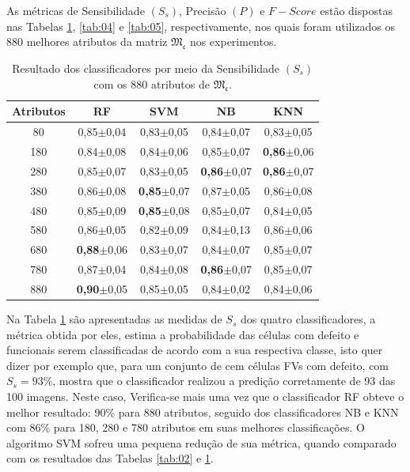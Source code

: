 \documentclass[a4paper]{ifacconf}
\begin{document}
As métricas de  Sensibilidade $(S_s)$, Precisão $(P)$ e $F-Score$ estão dispostas nas Tabelas \ref{tab:03}, \ref{tab:04} e \ref{tab:05}, respectivamente, nos quais foram utilizados os 880 melhores atributos da matriz $\mathfrak{M_c}$ nos experimentos.

\begin{table}[h]	
	\centering
	\caption{Resultado dos classificadores por meio da Sensibilidade $(S_s)$ com os 880 atributos de $\mathfrak{M_c}$.}\label{tab:03}	
		\begin{tabular}{ccccc}\hline
			    \textbf{Atributos} & \textbf{RF} & \textbf{SVM} & \textbf{NB} & \textbf{KNN}\\ \hline
			 80 & 0,85$\pm$0,04 & 0,83$\pm$0,05 & 0,84$\pm$0,07 & 0,83$\pm$0,05 \\
			180 & 0,84$\pm$0,08 & 0,84$\pm$0,06 & 0,85$\pm$0,07 & \textbf{0,86}$\pm$0,06 \\
			280 & 0,85$\pm$0,07 & 0,83$\pm$0,05 & \textbf{0,86}$\pm$0,07 & \textbf{0,86}$\pm$0,07 \\
			380 & 0,86$\pm$0,08 & \textbf{0,85}$\pm$0,07 & 0,87$\pm$0,05 & 0,86$\pm$0,08 \\
			480 & 0,85$\pm$0,09 & \textbf{0,85}$\pm$0,08 & 0,85$\pm$0,07 & 0,84$\pm$0,05 \\
			580 & 0,86$\pm$0,05 & 0,82$\pm$0,09 & 0,84$\pm$0,13 & 0,86$\pm$0,06 \\
			680 & \textbf{0,88}$\pm$0,06 & 0,83$\pm$0,07 & 0,84$\pm$0,07 & 0,85$\pm$0,07 \\
			780 & 0,87$\pm$0,04 & 0,84$\pm$0,08 & \textbf{0,86}$\pm$0,07 & 0,85$\pm$0,07 \\
			880 & \textbf{0,90}$\pm$0,05 & 0,85$\pm$0,05 & 0,84$\pm$0,02 & 0,84$\pm$0,06 \\
			\hline
		\end{tabular}
\end{table}

Na Tabela \ref{tab:03} são apresentadas as medidas de $S_s$ dos quatro classificadores, a métrica obtida por eles, estima a probabilidade das células com defeito e funcionais serem classificadas de acordo com a sua respectiva classe, isto quer dizer por exemplo que, para um conjunto de cem células FVs com defeito, com $S_s=93\%$, mostra que o classificador realizou a predição corretamente de 93 das 100 imagens. Neste caso,  Verifica-se mais uma vez que o classificador RF obteve o melhor resultado: 90\% para 880 atributos, seguido dos classificadores NB e KNN com 86\% para 180, 280 e 780 atributos em suas melhores classificações. O algoritmo SVM sofreu uma pequena redução de sua métrica, quando comparado com os resultados das Tabelas \ref{tab:02} e \ref{tab:03}. 
\end{document}
